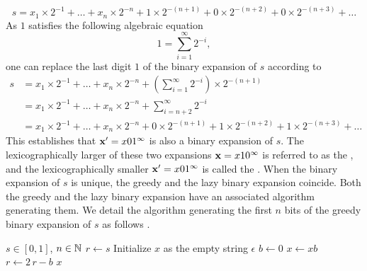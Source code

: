   \begin{equation}\label{eq:greedy expansion ending with infinitetail of zeros}
	s = x_1 \times 2^{-1} + \ldots + x_n \times 2^{-n} + 1 \times 2^{-(n+1)} + 0 \times 2^{-(n+2)} + 0 \times 2^{-(n+3)} + \ldots
  \end{equation}
As $1$ satisfies the following algebraic equation
\begin{equation}\label{eq:algebraic relation between 1 and powers of one half}
	1 = \sum_{i=1}^\infty 2^{-i},
\end{equation}
one can replace the last digit $1$ of the binary expansion of $s$ according to
\begin{align}
	s &= x_1 \times 2^{-1} + \ldots + x_n \times 2^{-n} + \left(\sum_{i=1}^\infty 2^{-i}\right) \times 2^{-(n+1)}\\
	&= x_1 \times 2^{-1} + \ldots + x_n \times 2^{-n} + \sum_{i=n+2}^\infty 2^{-i}\\
	&= x_1 \times 2^{-1} + \ldots + x_n \times 2^{-n} + 0 \times 2^{-(n+1)} + 1 \times 2^{-(n+2)} +  1 \times 2^{-(n+3)} + \ldots \label{eq:lazy expansion ending with infinitetail of ones}
  \end{align}
This establishes that ${\bf x}' = x 0  1^\infty$ is also a binary expansion of $s$. The lexicographically larger of these two expansions  ${\bf x} = x  1  0^\infty$ is referred to as the , and the lexicographically smaller ${\bf x}' = x  0  1^\infty$ is called the . When the binary expansion of $s$ is unique, the greedy and the lazy binary expansion coincide. Both the greedy and the lazy binary expansion have an associated algorithm generating them. We detail the algorithm generating the first $n$ bits of the greedy binary expansion of $s$ as follows \cite[Section 2]{dajani2002greedy}.
\begin{algorithm}[ht]
	\caption{Greedy algorithm for binary expansion}\label{alg:greedy algorithm binary expansion}
	\begin{algorithmic}[1]
		\Require $s \in [0,1]$, $n \in \mathbb{N}$
		\State $r \gets s$
		\State Initialize $x$ as the empty string $\epsilon$
		\label{alg1:line 3}
			 $b \gets 0$ \label{alg1:line 4}
			\EndIf
			\State $x \gets xb$
			\State $r \gets 2 \, r - b$
		\EndFor
		\State \Return $x$
	\end{algorithmic}
\end{algorithm}


